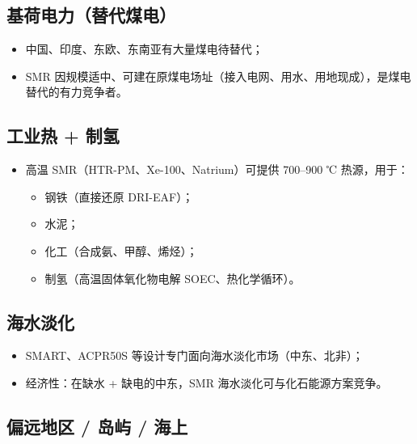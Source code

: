 \documentclass[
  UTF8,
  scheme=plain,
  fontsize=10pt,
  openany
]{ctexbook}
\begin{document}
\subsection{基荷电力（替代煤电）}\label{ux57faux8377ux7535ux529bux66ffux4ee3ux7164ux7535}

\begin{itemize}
\tightlist
\item
  中国、印度、东欧、东南亚有大量煤电待替代；
\item
  SMR
  因规模适中、可建在原煤电场址（接入电网、用水、用地现成），是煤电替代的有力竞争者。
\end{itemize}

\subsection{工业热 + 制氢}\label{ux5de5ux4e1aux70ed-ux5236ux6c22}

\begin{itemize}
\tightlist
\item
  高温 SMR（HTR-PM、Xe-100、Natrium）可提供 700--900 ℃ 热源，用于：

  \begin{itemize}
  \tightlist
  \item
    钢铁（直接还原 DRI-EAF）；
  \item
    水泥；
  \item
    化工（合成氨、甲醇、烯烃）；
  \item
    制氢（高温固体氧化物电解 SOEC、热化学循环）。
  \end{itemize}
\end{itemize}

\subsection{海水淡化}\label{ux6d77ux6c34ux6de1ux5316}

\begin{itemize}
\tightlist
\item
  SMART、ACPR50S 等设计专门面向海水淡化市场（中东、北非）；
\item
  经济性：在缺水 + 缺电的中东，SMR 海水淡化可与化石能源方案竞争。
\end{itemize}

\subsection{偏远地区 / 岛屿 /
海上}\label{ux504fux8fdcux5730ux533a-ux5c9bux5c7f-ux6d77ux4e0a}
\end{document}
